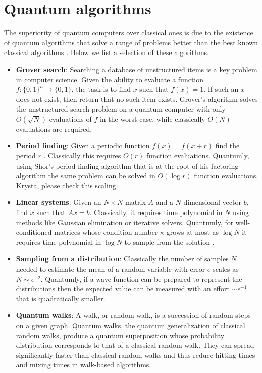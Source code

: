 \documentclass[journal]{IEEEtran}
\begin{document}
\section{Quantum algorithms}
\label{sec:box2}
The superiority of quantum computers over classical ones is due to the existence of quantum algorithms that solve a range of problems  better  than the best known classical algorithms \cite{jordan2011quantum}. Below we list a selection of these algorithms.

\begin{itemize}
\item {\bf Grover search}:
Searching a database of unstructured items is a key problem in computer science.  Given the ability to evaluate a function $f: \{0,1\}^n\rightarrow \{0,1\}$, the task is to find $x$ such that $f(x)=1$.  If such an $x$ does not exist, then return that no such item exists.   
Grover's algorithm solves the unstructured search problem on a quantum computer with only $O(\sqrt{N})$ evaluations of $f$ in the worst case, while classically $O(N)$ evaluations are required.  

\item {\bf Period finding}: Given a periodic function $f(x)=f(x+r)$ find the period $r$ . Classically this requires $O(r)$ function evaluations. Quantumly, using Shor's period finding algorithm that is at the root of his factoring algorithm the same problem can be solved in $O(\log r)$ function evaluations. {\color{red} Krysta, please check this scaling.}


\item {\bf Linear systems}: Given an $N\times N$ matrix $A$ and a $N$-dimensional vector $b$, find $x$ such that $Ax=b$.
Classically, it requires time polynomial in $N$ using methods like Gaussian elimination or iterative solvers. Quantumly, for well-conditioned matrices whose condition number $\kappa$ grows at most as $\log N$ it requires time polynomial in $\log N$ to sample from the solution \cite{}. 



\item  {\bf  Sampling from a distribution}: Classically the number of samples $N$ needed to estimate the mean of a random variable with error $\epsilon$  scales as $N\sim \epsilon^{-2}$. Quantumly, if a wave function can be prepared to represent the distributions then the expected value can be measured with an effort  $\sim\epsilon^{-1}$ that is quadratically smaller.

\item       {\bf Quantum walks}:
A walk, or random walk, is a succession of random steps on a given graph. Quantum walks, the quantum generalization of classical random walks, produce a quantum superposition whose probability distribution corresponds to that of a classical random walk. They can spread significantly faster than classical random walks and thus reduce hitting times and mixing times in walk-based algorithms.



\end{itemize}
\end{document}
